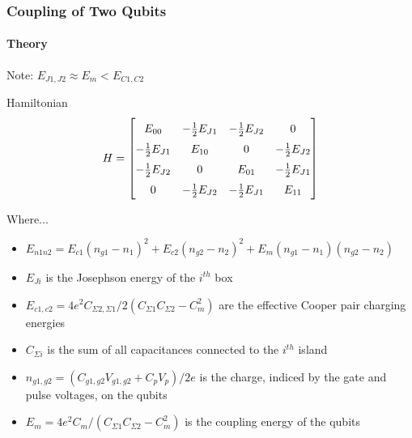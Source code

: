 \documentclass{beamer}
\begin{document}
\begin{frame}
    \frametitle{Coupling of Two Qubits}
    \framesubtitle{Theory}
    \centering
    Note: $E_{J1,J2} \approx E_m < E_{C1,C2}$
    \begin{block}{Hamiltonian}
        \fontsize{8}{7.2}\selectfont
        $$
        H=
        \begingroup
            \renewcommand*{\arraystretch}{1.5}
            \begin{bmatrix}
                E_{00} & -\frac{1}{2}E_{J1} & -\frac{1}{2}E_{J2} & 0 \\
                -\frac{1}{2}E_{J1} & E_{10} & 0 & -\frac{1}{2}E_{J2} \\
                -\frac{1}{2}E_{J2} & 0 & E_{01} & -\frac{1}{2}E_{J1} \\
                0 & -\frac{1}{2}E_{J2} & -\frac{1}{2}E_{J1} & E_{11}
            \end{bmatrix}
        \endgroup
        $$
        
        Where...
        \begin{itemize}
            \item $E_{n1n2}=E_{c1}(n_{g1}-n_1)^2 + E_{c2}(n_{g2}-n_2)^2 + E_{m}(n_{g1}-n_1)(n_{g2}-n_2)$
            \item $E_{Ji}$ is the Josephson energy of the $i^{th}$ box
            \item $E_{c1,c2}=4e^2C_{\Sigma 2,\Sigma 1} / 2(C_{\Sigma 1} C_{\Sigma 2} - C_m^2)$ are the effective Cooper pair charging energies
            \item $C_{\Sigma i}$ is the sum of all capacitances connected to the $i^{th}$ island
            \item $n_{g1,g2}=(C_{g1,g2}V_{g1,g2}+C_pV_p)/2e$ is the charge, indiced by the gate and pulse voltages, on the qubits
            \item $E_m=4e^2C_m/(C_{\Sigma 1}C_{\Sigma 2}-C_m^2)$ is the coupling energy of the qubits
        \end{itemize}
    \end{block}
\end{frame}

\end{document}
